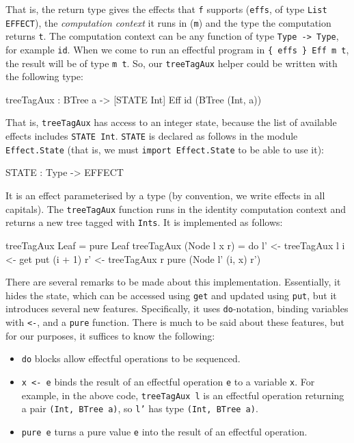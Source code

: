 \noindent
That is, the return type gives the effects that \texttt{f} supports
(\texttt{effs}, of type \texttt{List EFFECT}), 
the \emph{computation context} it runs in (\texttt{m}) and the
type the computation returns \texttt{t}. The computation context can be
any function of type \texttt{Type -> Type}, for example \texttt{id}. 
When we come to run an effectful program in \texttt{\{ effs \} Eff m t},
the result will be of type \texttt{m t}.
So, our
\texttt{treeTagAux} helper could be written with the following type:

\begin{code}
treeTagAux : BTree a -> { [STATE Int] } Eff id (BTree (Int, a))
\end{code}

\noindent
That is, \texttt{treeTagAux} has access to an integer state, because the
list of available effects includes \texttt{STATE Int}. \texttt{STATE} is
declared as follows in the module \texttt{Effect.State} (that is, we must
\texttt{import Effect.State} to be able to use it):

\begin{code}
STATE : Type -> EFFECT
\end{code}

\noindent
It is an effect parameterised by a type (by convention, we write
effects in all capitals).
The \texttt{treeTagAux} function runs in the
identity computation context and
returns a new tree tagged with \texttt{Ints}. It is implemented as
follows:

\begin{code}
treeTagAux Leaf = pure Leaf
treeTagAux (Node l x r)
    = do l' <- treeTagAux l
         i <- get
         put (i + 1)
         r' <- treeTagAux r
         pure (Node l' (i, x) r')
\end{code}

\noindent
There are several remarks to be made about this implementation. Essentially,
it hides the state, which can be accessed using \texttt{get} and updated using
\texttt{put}, but it introduces several new features. Specifically, it uses
\texttt{do}-notation, binding variables with \texttt{<-}, and a
\texttt{pure} function. There is much to be said about these features, but
for our purposes, it suffices to know the following:

\begin{itemize}
\item \texttt{do} blocks allow effectful operations to be sequenced.
\item \texttt{x <- e} binds the result of an effectful operation \texttt{e} to
a variable \texttt{x}. For example, in the above code, \texttt{treeTagAux l}
is an effectful operation returning a pair \texttt{(Int, BTree a)}, so
\texttt{l'} has type \texttt{(Int, BTree a)}.
\item \texttt{pure e} turns a pure value \texttt{e} into the result of
an effectful operation. 
\end{itemize}

